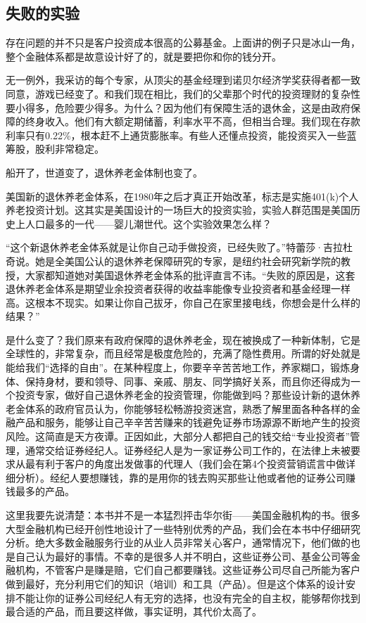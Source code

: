 \subsection{失败的实验}

存在问题的并不只是客户投资成本很高的公募基金。上面讲的例子只是冰山一角，整个金融体系都是故意设计好了的，就是要把你和你的钱分开。

无一例外，我采访的每个专家，从顶尖的基金经理到诺贝尔经济学奖获得者都一致同意，游戏已经变了。和我们现在相比，我们的父辈那个时代的投资理财的复杂性要小得多，危险要少得多。为什么？因为他们有保障生活的退休金，这是由政府保障的终身收入。他们有大额定期储蓄，利率水平不高，但相当合理。我们现在存款利率只有0.22\%，根本赶不上通货膨胀率。有些人还懂点投资，能投资买入一些蓝筹股，股利非常稳定。

船开了，世道变了，退休养老金体制也变了。

美国新的退休养老金体系，在1980年之后才真正开始改革，标志是实施401(k)个人养老投资计划。这其实是美国设计的一场巨大的投资实验，实验人群范围是美国历史上人口最多的一代——婴儿潮世代。这个实验效果怎么样？

“这个新退休养老金体系就是让你自己动手做投资，已经失败了。”特蕾莎·吉拉杜奇说。她是全美国公认的退休养老保障研究的专家，是纽约社会研究新学院的教授，大家都知道她对美国退休养老金体系的批评直言不讳。“失败的原因是，这套退休养老金体系是期望业余投资者获得的收益率能像专业投资者和基金经理一样高。这根本不现实。如果让你自己拔牙，你自己在家里接电线，你想会是什么样的结果？”

是什么变了？我们原来有政府保障的退休养老金，现在被换成了一种新体制，它是全球性的，非常复杂，而且经常是极度危险的，充满了隐性费用。所谓的好处就是能给我们“选择的自由”。在某种程度上，你要辛辛苦苦地工作，养家糊口，锻炼身体、保持身材，要和领导、同事、亲戚、朋友、同学搞好关系，而且你还得成为一个投资专家，做好自己退休养老金的投资管理，你能做到吗？那些设计新的退休养老金体系的政府官员认为，你能够轻松畅游投资迷宫，熟悉了解里面各种各样的金融产品和服务，能够让自己辛辛苦苦赚来的钱避免证券市场源源不断地产生的投资风险。这简直是天方夜谭。正因如此，大部分人都把自己的钱交给“专业投资者”管理，通常交给证券经纪人。证券经纪人是为一家证券公司工作的，在法律上未被要求从最有利于客户的角度出发做事的代理人（我们会在第4个投资营销谎言中做详细分析）。经纪人要想赚钱，靠的是用你的钱去购买那些让他或者他的证券公司赚钱最多的产品。

这里我要先说清楚：本书并不是一本猛烈抨击华尔街——美国金融机构的书。很多大型金融机构已经开创性地设计了一些特别优秀的产品，我们会在本书中仔细研究分析。绝大多数金融服务行业的从业人员非常关心客户，通常情况下，他们做的也是自己认为最好的事情。不幸的是很多人并不明白，这些证券公司、基金公司等金融机构，不管客户是赚是赔，它们自己都要赚钱。这些证券公司尽自己所能为客户做到最好，充分利用它们的知识（培训）和工具（产品）。但是这个体系的设计安排不能让你的证券公司经纪人有无穷的选择，也没有完全的自主权，能够帮你找到最合适的产品，而且要这样做，事实证明，其代价太高了。

